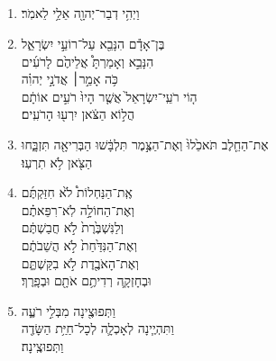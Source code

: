 \documentclass[12pt,a4paper,titlepage]{article}
\def \verseSpace{\vskip 0.45em}
\def \pscolor{red} %
\def \pslabelsep{0.8em} %
\def \psleftmargin{0em} %
\begin{document}
\begin{hebrew}

\newpage

\section*{}
\subsection*{}
\vspace{-0.6mm}
\begin{enumerate}[leftmargin=\psleftmargin, labelsep=\pslabelsep, label=\fontspec{Linux Libertine}\arabic*, font=\color{\pscolor}\small\textsuperscript, parsep=0em, itemsep=0em, topsep=0em]
      \item \texthebrew{וַיְהִ֥י דְבַר־יְהוָ֖ה אֵלַ֥י לֵאמֹֽר׃}
      \item \texthebrew{ בֶּן־אָדָ֕ם הִנָּבֵ֖א עַל־רוֹעֵ֣י יִשְׂרָאֵ֑ל \\ הִנָּבֵ֣א וְאָמַרְתָּ֩ אֲלֵיהֶ֙ם לָרֹעִ֜ים \\ כֹּ֥ה אָמַ֣ר׀ אֲדֹנָ֣י יְהוִ֗ה \\ ה֤וֹי רֹעֵֽי־יִשְׂרָאֵל֙ אֲשֶׁ֤ר הָיוּ֙ רֹעִ֣ים אוֹתָ֔ם \\ הֲל֣וֹא הַצֹּ֔אן יִרְע֖וּ הָרֹעִֽים׃}
      \item \texthebrew{אֶת־הַחֵ֤לֶב תֹּאכֵ֙לוּ֙ וְאֶת־הַצֶּ֣מֶר תִּלְבָּ֔שׁוּ הַבְּרִיאָ֖ה תִּזְבָּ֑חוּ \\ הַצֹּ֖אן לֹ֥א תִרְעֽוּ׃}
      \item \texthebrew{אֶֽת־הַנַּחְלוֹת֩ לֹ֙א חִזַּקְתֶּ֜ם \\ וְאֶת־הַחוֹלָ֣ה לֹֽא־רִפֵּאתֶ֗ם \\ וְלַנִּשְׁבֶּ֙רֶת֙ לֹ֣א חֲבַשְׁתֶּ֔ם \\ וְאֶת־הַנִּדַּ֙חַת֙ לֹ֣א הֲשֵׁבֹתֶ֔ם \\ וְאֶת־הָאֹבֶ֖דֶת לֹ֣א בִקַּשְׁתֶּ֑ם \\ וּבְחָזְקָ֛ה רְדִיתֶ֥ם אֹתָ֖ם וּבְפָֽרֶךְ׃}
      \item \texthebrew{וַתְּפוּצֶ֖ינָה מִבְּלִ֣י רֹעֶ֑ה \\ וַתִּהְיֶ֧ינָה לְאָכְלָ֛ה לְכָל־חַיַּ֥ת הַשָּׂדֶ֖ה \\ וַתְּפוּצֶֽינָה׃}

\end{enumerate}
\end{hebrew}
\end{document}
